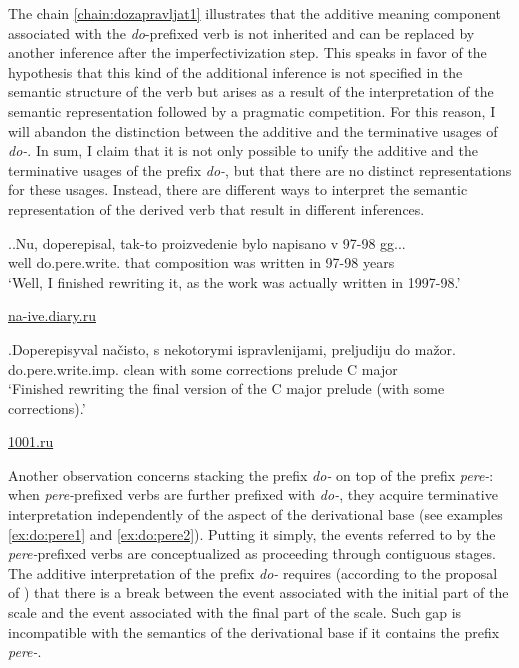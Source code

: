 The chain \ref{chain:dozapravljat1} illustrates that the additive meaning component associated with the \textit{do}-prefixed verb is not inherited and can be replaced by another inference after the imperfectivization step. This speaks in favor of the hypothesis that this kind of the additional inference is not specified in the semantic structure of the verb but arises as a result of the interpretation of the semantic representation followed by a pragmatic competition. For this reason, I will abandon the distinction between the additive and the terminative usages of \textit{do-}. In sum, I claim that it is not only possible to unify the additive and the terminative usages of the prefix \textit{do-}, but that there are no distinct representations for these usages. Instead, there are different ways to interpret the semantic representation of the derived verb that result in different inferences. 

\ex.\ag.\label{ex:do:pere1}Nu, doperepisal, tak-to proizvedenie bylo napisano v 97-98 gg...\\
well do.pere.write. that composition was written in 97-98 years\\
\vspace{0.5em}
`Well, I finished rewriting it, as the work was actually written in 1997-98.'
\begin{flushright}
\vspace{-0.5em}
\url{na-ive.diary.ru}
\end{flushright}
\bg.\label{ex:do:pere2}Doperepisyval na\v{c}isto, s nekotorymi ispravlenijami, preljudiju do ma\v{z}or.\\
do.pere.write.imp. clean with some corrections prelude C major\\
\vspace{0.5em}
`Finished rewriting the final version of the C major prelude (with some corrections).'
\begin{flushright}
\vspace{-0.5em}
\url{1001.ru}
\end{flushright}

Another observation concerns stacking the prefix \textit{do-} on top of the prefix  \textit{pere-}: when \textit{pere-}prefixed verbs are further prefixed with \textit{do-}, they acquire terminative interpretation independently of the aspect of the derivational base (see examples \ref{ex:do:pere1} and \ref{ex:do:pere2}). Putting it simply, the events referred to by the \textit{pere-}prefixed verbs are conceptualized as proceeding through contiguous stages. The additive interpretation of the prefix \textit{do-} requires (according to the proposal of \citet{Kagan:book}) that there is a break between the event associated with the initial part of the scale and the event associated with the final part of the scale. Such gap is incompatible with the semantics of the derivational base if it contains the prefix \textit{pere-}. 

